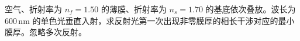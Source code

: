 空气、折射率为 $n_f=1.50$ 的薄膜、折射率为 $n_s=1.70$ 的基底依次叠放。波长为 $600\,\mathrm{nm}$ 的单色光垂直入射，求反射光第一次出现非零膜厚的相长干涉对应的最小膜厚。忽略多次反射。
